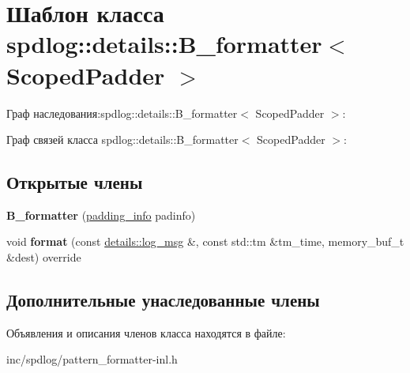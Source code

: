 \hypertarget{classspdlog_1_1details_1_1B__formatter}{}\section{Шаблон класса spdlog\+:\+:details\+:\+:B\+\_\+formatter$<$ Scoped\+Padder $>$}
\label{classspdlog_1_1details_1_1B__formatter}


Граф наследования\+:spdlog\+:\+:details\+:\+:B\+\_\+formatter$<$ Scoped\+Padder $>$\+:


Граф связей класса spdlog\+:\+:details\+:\+:B\+\_\+formatter$<$ Scoped\+Padder $>$\+:
\subsection*{Открытые члены}
\begin{DoxyCompactItemize}
\item 
\mbox{\label{classspdlog_1_1details_1_1B__formatter_a07e4a5e633ad09006d63c682ed27295c}} 
{\bfseries B\+\_\+formatter} (\hyperlink{structspdlog_1_1details_1_1padding__info}{padding\+\_\+info} padinfo)
\item 
\mbox{\label{classspdlog_1_1details_1_1B__formatter_a4755159b22b8e77459a7687fb1ccbea3}} 
void {\bfseries format} (const \hyperlink{structspdlog_1_1details_1_1log__msg}{details\+::log\+\_\+msg} \&, const std\+::tm \&tm\+\_\+time, memory\+\_\+buf\+\_\+t \&dest) override
\end{DoxyCompactItemize}
\subsection*{Дополнительные унаследованные члены}


Объявления и описания членов класса находятся в файле\+:\begin{DoxyCompactItemize}
\item 
inc/spdlog/pattern\+\_\+formatter-\/inl.\+h\end{DoxyCompactItemize}

